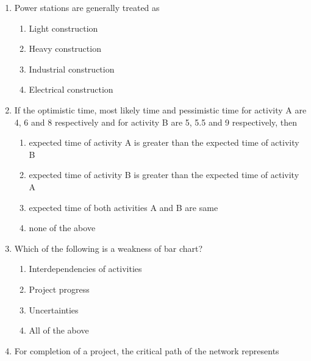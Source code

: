 \documentclass[11pt,a4paper]{article}
\begin{document}
\begin{enumerate}
\\
\item{Power stations are generally treated as}
\begin{enumerate}[label=\Alph*.]
\item{Light construction}
\item{Heavy construction}
\item{Industrial construction}
\item{Electrical construction}
\end{enumerate}
\item{If the optimistic time, most likely time and pessimistic time for activity A are 4, 6 and 8 respectively and for activity B are 5, 5.5 and 9 respectively, then}
\begin{enumerate}[label=\Alph*.]
\item{expected time of activity A is greater than the expected time of activity B}
\item{expected time of activity B is greater than the expected time of activity A}
\item{expected time of both activities A and B are same}
\item{none of the above}
\end{enumerate}
\item{Which of the following is a weakness of bar chart?}
\begin{enumerate}[label=\Alph*.]
\item{Interdependencies of activities}
\item{Project progress}
\item{Uncertainties}
\item{All of the above}
\end{enumerate}
\item{For completion of a project, the critical path of the network represents}
\\
\end{enumerate}
\end{document}
